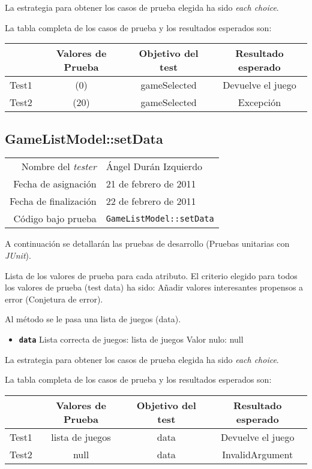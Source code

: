 La estrategia para obtener los casos de prueba elegida ha sido
\textit{each choice}.

La tabla completa de los casos de prueba y los resultados esperados son:

{\footnotesize
\begin{longtable}[c]{lccc}
 & \textbf{Valores de Prueba} & \textbf{Objetivo del test} & \textbf{Resultado esperado} \\
\hline \hline
\endhead

Test1 & (0) & gameSelected & Devuelve el juego\\
Test2 & (20) & gameSelected & Excepci\'on\\

\hline
\end{longtable}
}

\subsection{GameListModel::setData}

{\small
\begin{tabular}{r|l}
Nombre del \textit{tester} & \'Angel Dur\'an Izquierdo\\
Fecha de asignación & 21 de febrero de 2011 \\
Fecha de finalización & 22 de febrero de 2011 \\
Código bajo prueba & \texttt{GameListModel::setData}
\end{tabular}
}

A continuación se detallarán las pruebas de desarrollo (Pruebas unitarias con \textit{JUnit}).

Lista de los valores de prueba para cada atributo.
El criterio elegido para todos los valores de prueba (test data) ha sido: Añadir valores interesantes propensos a error (Conjetura de error).

Al m\'etodo se le pasa una lista de juegos (data).

\begin{itemize}
\item \textbf{\texttt{data}}
\subitem Lista correcta de juegos: lista de juegos
\subitem Valor nulo: null
\end{itemize}

La estrategia para obtener los casos de prueba elegida ha sido
\textit{each choice}.

La tabla completa de los casos de prueba y los resultados esperados son:

{\footnotesize
\begin{longtable}[c]{lccc}
 & \textbf{Valores de Prueba} & \textbf{Objetivo del test} & \textbf{Resultado esperado} \\
\hline \hline
\endhead

Test1 & lista de juegos & data & Devuelve el juego\\
Test2 & null & data & InvalidArgument\\

\hline
\end{longtable}
}

